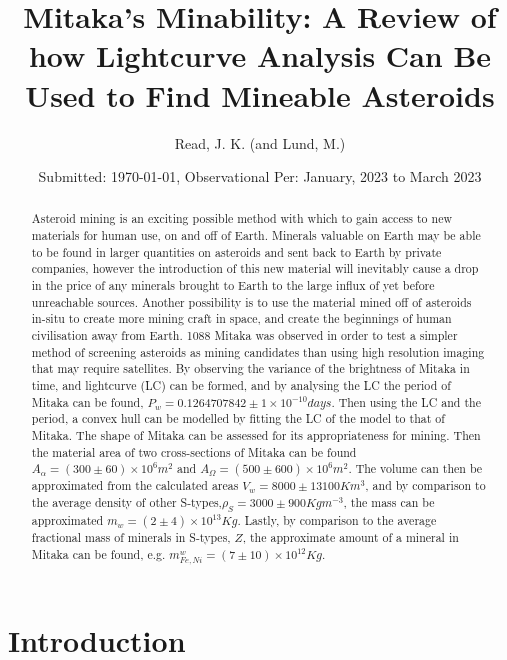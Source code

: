 \documentclass[10pt,twocolumn]{revtex4}    %
\newcommand{\E}[1]{\times10^{#1}}
\begin{document}
\title{Mitaka's Minability: A Review of how Lightcurve Analysis Can Be Used to Find Mineable Asteroids} 
\date{Submitted: \today{}, Observational Per: January, 2023 to March 2023}
\author{Read, J. K. (and Lund, M.)}



\begin{abstract}    
Asteroid mining is an exciting possible method with which to gain access to new materials for human use, on and off of Earth. Minerals valuable on Earth may be able to be found in larger quantities on asteroids and sent back to Earth by private companies, however the introduction of this new material will inevitably cause a drop in the price of any minerals brought to Earth to the large influx of yet before unreachable sources. Another possibility is to use the material mined off of asteroids in-situ to create more mining craft in space, and create the beginnings of human civilisation away from Earth. 1088 Mitaka was observed in order to test a simpler method of screening asteroids as mining candidates than using high resolution imaging that may require satellites. By observing the variance of the brightness of Mitaka in time, and lightcurve (LC) can be formed, and by analysing the LC the period of Mitaka can be found, $P_w = 0.1264707842 \pm 1\times10^{-10}days$. Then using the LC and the period, a convex hull can be modelled by fitting the LC of the model to that of Mitaka. The shape of Mitaka can be assessed for its appropriateness for mining. Then the material area of two cross-sections of Mitaka can be found $A_\alpha=(300 \pm 60)\times10^6 m^2$ and $A_\Omega = (500\pm 600)\times10^6 m^2$. The volume can then be approximated from the calculated areas $V_w = 8000 \pm 13100 Km^3$, and by comparison to the average density of other S-types,$\rho_S = 3000 \pm 900 Kg m^{-3}$, the mass can be approximated $m_w = (2 \pm 4)\times10^{13} Kg$. Lastly, by comparison to the average fractional mass of minerals in S-types, $Z$, the approximate amount of a mineral in Mitaka can be found, e.g. $m^w_{Fe,Ni} = (7\pm10)\E{12} Kg$.
\end{abstract}

\maketitle

\thispagestyle{plain} %

\section{Introduction}
\end{document}
